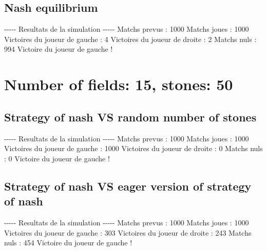 \documentclass{article}%
\begin{document}
%
\subsection{Nash equilibrium}%
\label{subsec:Nash equilibrium}%
{-}{-}{-}{-}{-} Resultats de la simulation {-}{-}{-}{-}{-}\newline%
		\newline%
Matchs prevus : 1000\newline%
Matchs joues : 1000\newline%
\newline%
Victoires du joueur de gauche : 4\newline%
Victoires du joueur de droite : 2\newline%
Matchs nuls : 994\newline%
\newline%
Victoire du joueur de gauche !

%
\section{Number of fields: 15, stones: 50}%
\label{sec:Number of fields 15, stones 50}%
\subsection{Strategy of nash VS random number of stones}%
\label{subsec:Strategy of nash VS random number of stones}%
{-}{-}{-}{-}{-} Resultats de la simulation {-}{-}{-}{-}{-}\newline%
		\newline%
Matchs prevus : 1000\newline%
Matchs joues : 1000\newline%
\newline%
Victoires du joueur de gauche : 1000\newline%
Victoires du joueur de droite : 0\newline%
Matchs nuls : 0\newline%
\newline%
Victoire du joueur de gauche !

%
\subsection{Strategy of nash VS eager version of strategy of nash}%
\label{subsec:Strategy of nash VS eager version of strategy of nash}%
{-}{-}{-}{-}{-} Resultats de la simulation {-}{-}{-}{-}{-}\newline%
		\newline%
Matchs prevus : 1000\newline%
Matchs joues : 1000\newline%
\newline%
Victoires du joueur de gauche : 303\newline%
Victoires du joueur de droite : 243\newline%
Matchs nuls : 454\newline%
\newline%
Victoire du joueur de gauche !
\end{document}
